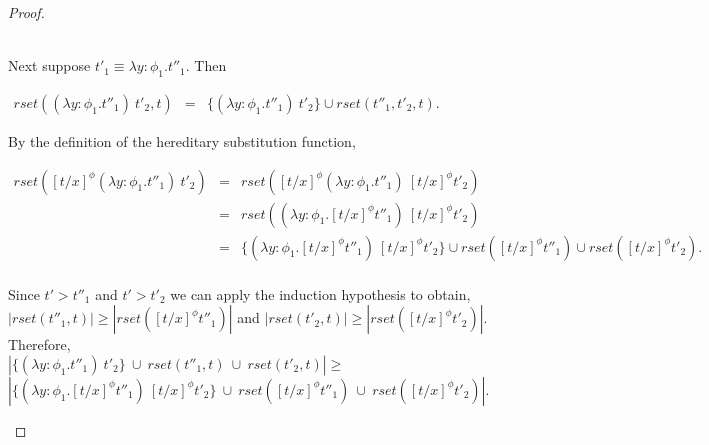 \begin{proof}
\begin{itemize}
  \ \\
  Next suppose $t'_1 \equiv \lambda y:\phi_1.t''_1$.  Then 
  \begin{center}
    \begin{math}
      \begin{array}{lll}
        rset((\lambda y:\phi_1.t''_1)\ t'_2, t) & = & \{ (\lambda y:\phi_1.t''_1)\ t'_2\} \cup rset(t''_1, t'_2, t).
      \end{array}
    \end{math}
  \end{center}
  By the definition of the hereditary substitution function,
  \begin{center}
    \begin{math}
      \begin{array}{lll}
        rset([t/x]^\phi (\lambda y:\phi_1.t''_1)\ t'_2) & = & rset([t/x]^\phi (\lambda y:\phi_1.t''_1)\ [t/x]^\phi t'_2)\\
        & = & rset((\lambda y:\phi_1.[t/x]^\phi t''_1)\ [t/x]^\phi t'_2)\\
        & = & \{(\lambda y:\phi_1.[t/x]^\phi t''_1)\ [t/x]^\phi t'_2\} \cup 
        rset([t/x]^\phi t''_1) \cup rset([t/x]^\phi t'_2).\\
        
      \end{array}
    \end{math}
  \end{center}
  Since $t' > t''_1$ and $t' > t'_2$ we can apply the induction hypothesis to obtain,
  $|rset(t''_1, t)| \geq |rset([t/x]^\phi t''_1)|$ and $|rset(t'_2,t)| \geq |rset([t/x]^\phi t'_2)|$.  Therefore, \\
  $|\{ (\lambda y:\phi_1.t''_1)\ t'_2\}\ \cup\ rset(t''_1,t)\ \cup\ rset(t'_2,t)| \geq $ 
  $|\{(\lambda y:\phi_1.[t/x]^\phi t''_1)\ [t/x]^\phi t'_2\}\ \cup\ rset([t/x]^\phi t''_1)\ \cup\ rset([t/x]^\phi t'_2)|$.
  

\end{itemize}
\end{proof}
